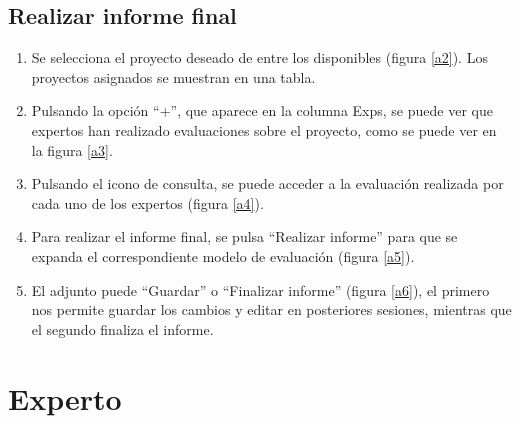 \documentclass[12pt,a4paper,titlepage,spanish,twoside]{book}
\begin{document}
\subsection{Realizar informe final}
\begin{enumerate}
\item Se selecciona el proyecto deseado de entre los disponibles (figura 
  \ref{a2}). Los proyectos asignados se muestran en una tabla.
  

\item Pulsando la opción ``+'', que aparece en la columna Exps, se puede ver que
  expertos han realizado evaluaciones sobre el proyecto, como se puede ver en
  la figura \ref{a3}. 


\item Pulsando el icono de consulta, se puede acceder a la evaluación realizada 
  por cada uno de los expertos (figura \ref{a4}).


\item Para realizar el informe final, se pulsa ``Realizar informe'' 
  para que se expanda el correspondiente modelo de evaluación (figura \ref{a5}).
  

\item El adjunto puede ``Guardar'' o ``Finalizar informe'' 
  (figura \ref{a6}), el primero nos permite guardar los cambios y editar en 
  posteriores sesiones, mientras que el segundo finaliza el informe.
  
\end{enumerate}

\section{Experto}
\end{document}
